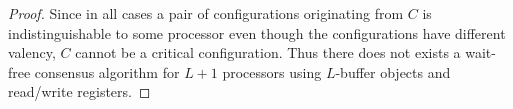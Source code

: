 \documentclass[11pt]{article}
\begin{document}
\begin{proof}
Since in all cases a pair of configurations originating from $C$ is indistinguishable to some processor even though the configurations have different valency, $C$ cannot be a critical configuration. Thus there does not exists a wait-free consensus algorithm for $L+1$ processors using $L$-buffer objects and read/write registers.  
\end{proof}

\end{document}
